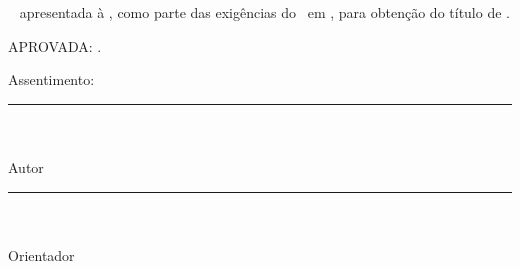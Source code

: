 \newpage
\thispagestyle{empty}
\begin{spacing}{1}
\begin{center}
{\MakeUppercase{\textbf{\nome}} \\ }

\vspace*{4.2cm}
{\MakeUppercase{\textbf{\titulo}} \\ }
\end{center}

\vspace*{2.6cm}
\singlespacing
\begin{flushright}
\begin{minipage}{225pt}
\fontcapa
{\tipo~ apresentada à \instituicao, como parte
  das exigências do \programa~em \curso, para
  obtenção do título de \textit{\titulop}.
} 

\end{minipage}
\end{flushright}
\vspace*{1.3cm}
%
%
APROVADA: \aprovacao.
\vspace*{2.15cm}
\begin{flushleft}
Assentimento:
\end{flushleft}
\vspace*{2.15cm}
\begin{center}
\begin{minipage}{8.5cm}
{\begin{center}
\rule{\linewidth}{0.1mm} \\
{\nome}\\%
Autor
\end{center}
}

\end{minipage}
\vfill
\begin{minipage}{8.5cm}
{\begin{center}
\rule{\linewidth}{0.1mm} \\
{\orientador}\\%
Orientador
\end{center}}
\end{minipage}
\end{center}

\end{spacing}
